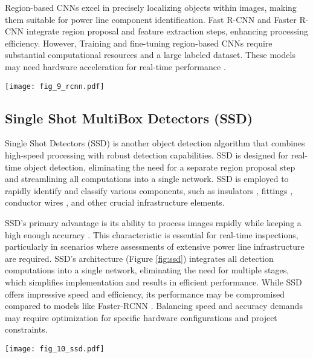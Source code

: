 Region-based CNNs excel in precisely localizing objects within images, making them suitable for power line component identification. Fast R-CNN and Faster R-CNN integrate region proposal and feature extraction steps, enhancing processing efficiency. However, Training and fine-tuning region-based CNNs require substantial computational resources and a large labeled dataset. These models may need hardware acceleration for real-time performance \cite{bharati2020deep}.

\begin{figure*}[htb]
    \centering
    \texttt{[image: fig\_9\_rcnn.pdf]}
    \caption{Simplified architecture of the Fast R-CNN Network.}
    \label{fig:rcnn}
\end{figure*}

\subsection{Single Shot MultiBox Detectors (SSD)}
Single Shot Detectors (SSD) \cite{liu_ssd_2016} is another object detection algorithm that combines high-speed processing with robust detection capabilities. SSD is designed for real-time object detection, eliminating the need for a separate region proposal step and streamlining all computations into a single network. SSD is employed to rapidly identify and classify various components, such as insulators \cite{miao_insulator_2019}, fittings \cite{nguyen_intelligent_2019}, conductor wires \cite{nguyen_intelligent_2019}, and other crucial infrastructure elements. 

SSD's primary advantage is its ability to process images rapidly while keeping a high enough accuracy \cite{huang2017speed}. This characteristic is essential for real-time inspections, particularly in scenarios where assessments of extensive power line infrastructure are required. SSD's architecture (Figure \ref{fig:ssd}) integrates all detection computations into a single network, eliminating the need for multiple stages, which simplifies implementation and results in efficient performance. While SSD offers impressive speed and efficiency, its performance may be compromised compared to models like Faster-RCNN \cite{huang2017speed}. Balancing speed and accuracy demands may require optimization for specific hardware configurations and project constraints.

\begin{figure*}[htb]
    \centering
    \texttt{[image: fig\_10\_ssd.pdf]}
    \caption{Simplified architecture of the Single Shot Multibox Detector (SSD) Network.}
    \label{fig:ssd}
\end{figure*}

